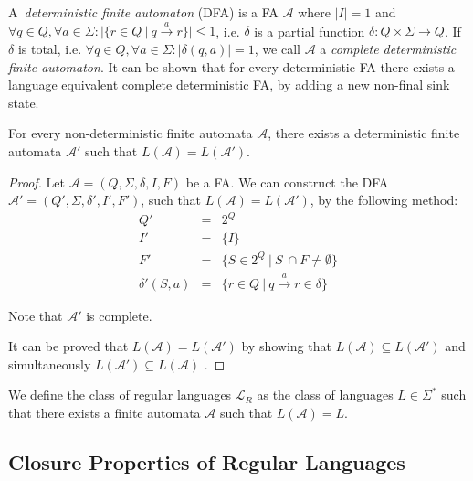 A~\emph{deterministic finite automaton} (DFA) is a FA $\mathcal{A}$ where $|I| =
1$ and $\forall q \in Q, \forall a \in \Sigma: |\{ r \in Q\ |\ q
\overset{a}{\longrightarrow} r\}| \leq 1$, i.e. $\delta$ is a partial function
$\delta : Q \times \Sigma \longrightarrow Q$. If $\delta$ is total, i.e.
$\forall q \in Q, \forall a \in \Sigma : |\delta(q, a)| = 1$, we call
$\mathcal{A}$ a \emph{complete deterministic finite automaton}. It can be shown
that for every deterministic FA there exists a language equivalent complete
deterministic FA, by adding a new non-final sink state.
	
	\begin{lemma}
For every non-deterministic finite automata $\mathcal{A}$, there exists a
deterministic finite automata $\mathcal{A}'$ such that $L(\mathcal{A}) =
L(\mathcal{A}')$.
	\end{lemma}
	
	\begin{proof}
	Let $\mathcal{A} = (Q, \Sigma, \delta, I, F)$ be a FA. We can construct
	the DFA $\mathcal{A}'= (Q', \Sigma, \delta', I', F')$, such that
	$L(\mathcal{A}) = L(\mathcal{A}')$, by the following method:
	\begin{eqnarray*}
	 Q' & = & 2^Q\\
	 I' & = & \{I\}\\
	 F' & = & \{S \in 2^Q\ |\ S~\cap F \neq \emptyset\}\\
	 \delta'(S, a) & = & \{r \in Q\ |\ q \overset{a}{\longrightarrow} r \in
	 \delta\}
	\end{eqnarray*}
	
	Note that $\mathcal{A}'$ is complete.
	
	It can be proved that $L(\mathcal{A}) = L(\mathcal{A}')$ by showing that
	$L(\mathcal{A}) \subseteq L(\mathcal{A}')$ and simultaneously $L(\mathcal{A}')
	\subseteq L(\mathcal{A})$ \cite{tin}.
	\end{proof}
	
	\begin{defz}
We define the class of regular languages $\mathcal{L}_R$ as the class of
languages $L \in \Sigma^*$ such that there exists a finite automata
$\mathcal{A}$ such that $L(\mathcal{A}) = L$.
	\end{defz}
	
 \subsection{Closure Properties of Regular Languages}

